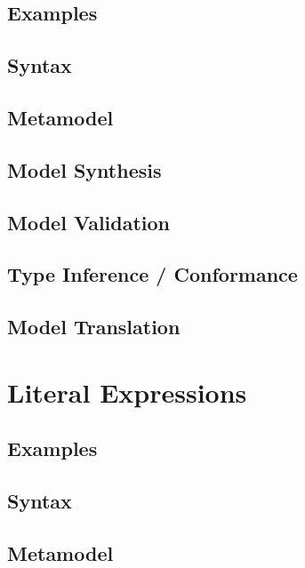\documentclass[a4paper,oneside,12pt, extrafontsizes]{memoir}
\begin{document}
    \section{Examples}
    

    \section{Syntax}
    

    \section{Metamodel}
    

    \section{Model Synthesis}
    

    \section{Model Validation}

    \section{Type Inference / Conformance}

    \section{Model Translation}

  \chapter{Literal Expressions}
  \label{ch:literals}
  

    \section{Examples}
    

    \section{Syntax}
    

    \section{Metamodel}
\end{document}
